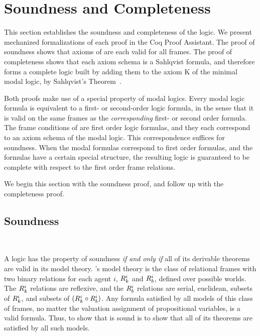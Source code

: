 


\section{Soundness and Completeness}

This section establishes the soundness and completeness of the logic.  We present mechanized formalizations of each proof in the Coq Proof Assistant. The proof of soundness shows that axioms of \DASL are each valid for all \DASL frames. The proof of completeness shows that each axiom schema is a Sahlqvist formula, and therefore forms a complete logic built by adding them to the axiom K of the minimal modal logic, by Sahlqvist's Theorem~\cite{sahlqvist}.

Both proofs make use of a special property of modal logics. Every modal logic formula is equivalent to a first- or second-order logic formula, in the sense that it is valid on the same frames as the \emph{corresponding} first- or second order formula. The frame conditions of \DASL are first order logic formulas, and they each correspond to an axiom schema of the modal logic. This correspondence suffices for soundness. When the modal formulas correspond to first order formulas, and the formulas have a certain special structure, the resulting logic is guaranteed to be complete with respect to the first order frame relations.

We begin this section with the soundness proof, and follow up with the completeness proof. 

\subsection{Soundness}~\label{sec:soundness}

A logic has the property of soundness \emph{if and only if} all of its derivable theorems are valid in its model theory. \DASL's model theory is the class of relational frames with two binary relations for each agent $i$, $R_{k}^i$ and $R_{b}^i$, defined over possible worlds. The $R_{k}^i$ relations are reflexive, and the $R_{b}^i$ relations are serial, euclidean, subsets of $R_{k}^i$, and subsets of $(R_{k}^i \circ R_{b}^i)$. Any formula satisfied by all models of this class of frames, no matter the valuation assignment of propositional variables, is a valid formula. Thus, to show that \DASL is sound is to show that all of its theorems are satisfied by all such models.

